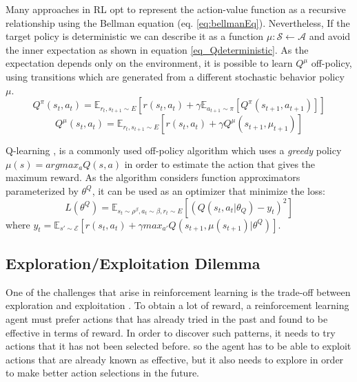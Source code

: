 Many approaches in RL opt to represent the action-value function as a recursive relationship using the Bellman equation (eq. \ref{eq:bellmanEq}). Nevertheless, If the target policy is deterministic we can describe it as a function $\mu: \mathcal{S} \leftarrow \mathcal{A}$ and avoid the inner expectation as shown in equation \ref{eq_Qdeterministic}. As the expectation depends only on the environment, it is possible to learn $Q^{\mu}$ off-policy, using transitions which are generated from a different stochastic behavior policy $\mu$.
\begin{equation}
\label{eq:bellmanEq}
Q^{\pi}(s_t, a_t) = \mathbb{E}_{r_{t}, s_{t+1} \sim E} [r(s_t, a_t) + \gamma \mathbb{E}_{a_{t+1} \sim \pi} [Q^{\pi}(s_{t+1}, a_{t+1})] ]
\end{equation}
\begin{equation}
\label{eq_Qdeterministic}
Q^{\mu}(s_t, a_t) = \mathbb{E}_{r_{t}, s_{t+1} \sim E} [r(s_t, a_t) + \gamma Q^{\mu}(s_{t+1}, \mu_{t+1}) ]
\end{equation}

Q-learning \cite{watkins1992q}, is a commonly used off-policy algorithm which uses a \textit{greedy} policy $\mu(s) = argmax_aQ(s, a)$ in order to estimate the action that gives the maximum reward. As the algorithm considers function approximators parameterized by $\theta^Q$, it can be used as an optimizer that minimize the loss:
\begin{equation}
\label{}
L(\theta^Q) = \mathbb{E}_{s_{t} \sim \rho^{\beta}, a_t \sim \beta, r_t \sim E} [(Q(s_t, a_t | \theta_Q) - y_t)^2]
\end{equation}
where $y_t = \mathbb{E}_{s'\sim \mathcal{E}} [r(s_t, a_t) + \gamma max_{a'} Q(s_{t+1}, \mu(s_{t+1}) | \theta^Q)]$. %

\subsection{Exploration/Exploitation Dilemma}

One of the challenges that arise in reinforcement learning is the trade-off between exploration and exploitation \cite{kaelbling1996reinforcement}\cite{sutton1998reinforcement}. To obtain a lot of reward, a reinforcement learning agent must prefer actions that has already tried in the past and found to be effective in terms of reward. In order to discover such patterns, it needs to try actions that it has not been selected before. so the agent has to be able to exploit actions that are already known as effective, but it also needs to explore in order to make better action selections in the future.

